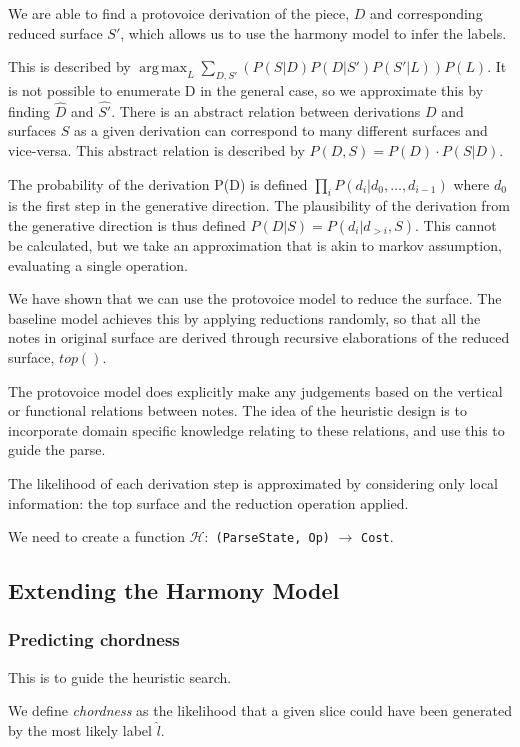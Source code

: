 \documentclass[12pt,a4paper,twoside,openright]{report}
\DeclareMathOperator*{\argmax}{arg\,max}
\theoremstyle{definition}
\begin{document}
We are able to find a protovoice derivation of the piece, $D$ and corresponding reduced surface $S'$, which allows us to use the harmony model to infer the labels. 

This is described by $\argmax_L \sum\limits_{D,S'}(P(S|D)P(D|S')P(S'|L)) P(L)$. 
It is not possible to enumerate D in the general case, so we approximate this by finding $\hat{D}$ and $\hat{S'}$. 
There is an abstract relation between derivations $D$ and surfaces $S$ as a given derivation can correspond to many different surfaces and vice-versa. 
This abstract relation is described by $P(D, S) = P(D)\cdot P(S|D)$. 

The probability of the derivation P(D) is defined $\prod_i P(d_i | d_0, \dots, d_{i-1})$ where $d_0$ is the first step in the generative direction. 
The plausibility of the derivation from the generative direction is thus defined $P(D|S) = P(d_i|d_{>i}, S)$. This cannot be calculated, but we take an approximation that is akin to markov assumption, evaluating a single operation. 

We have shown that we can use the protovoice model to reduce the surface.
The baseline model achieves this by applying reductions randomly, so that all the notes in original surface are derived through recursive elaborations of the reduced surface, $top()$.

The protovoice model does explicitly make any judgements based on the vertical or functional relations between notes. 
The idea of the heuristic design is to incorporate domain specific knowledge relating to these relations, and use this to guide the parse. 

The likelihood of each derivation step is approximated by considering only local information: the top surface and the reduction operation applied.

We need to create a function $\mathcal{H}:$ \texttt{(ParseState, Op)} $\to$ \texttt{Cost}. 

\subsection{Extending the Harmony Model}

\subsubsection{Predicting chordness}
This is to guide the heuristic search.

We define \textit{chordness} as the likelihood that a given slice could have been generated by the most likely label $\hat{l}$.
\end{document}
